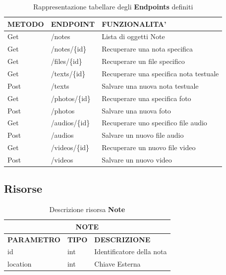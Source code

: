 \begin{table}[!h]
\centering
	\begin{tabular}{@{}lll@{}}
		\toprule
		METODO & ENDPOINT          & FUNZIONALITA’                   \\ \midrule
		Get    & /notes            & Lista di oggetti Note           \\
		Get    & /notes/\{id\}     & Recuperare una nota specifica    \\
		Get    & /files/\{id\}     & Recuperare un file specifico     \\
		Get    & /texts/\{id\}     & Recuperare una specifica nota testuale  \\
		Post   & /texts            & Salvare una nuova nota testuale \\
		Get    & /photos/\{id\}    & Recuperare una specifica foto   \\
		Post   & /photos           & Salvare una nuova foto          \\
		Get    & /audios/\{id\}    & Recuperare uno specifico file audio \\
		Post   & /audios           & Salvare un nuovo file audio               \\
		Get    & /videos/\{id\}    & Recuperare un nuovo file video      \\
		Post   & /videos           & Salvare un nuovo video               \\ \bottomrule
	\end{tabular}
\caption{Rappresentazione tabellare degli \textbf{Endpoints} definiti}\label{tab:endpoints}
\end{table}

\subsection{Risorse}

\begin{table}[!h]
\centering
	\begin{tabular}{@{}lll@{}}
		\toprule
		\multicolumn{3}{c}{{ \textbf{NOTE}}}                           \\ \midrule
		\textbf{PARAMETRO} & \textbf{TIPO} & \textbf{DESCRIZIONE}      \\ \midrule
		id                 & int           & Identificatore della nota \\ 
		location           & int           & Chiave Esterna            \\ \bottomrule
	\end{tabular}
\caption{Descrizione risorsa \textbf{Note}}\label{tab:noteModel}
\end{table}

